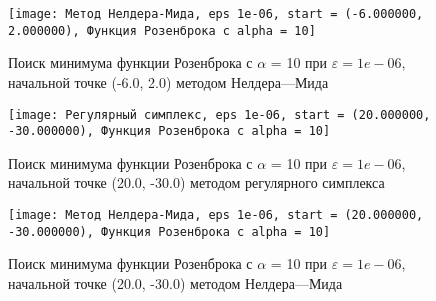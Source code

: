             \begin{figure}[H]
	        \centering
	        \texttt{[image: Метод Нелдера-Мида, eps 1e-06, start = (-6.000000, 2.000000), Функция Розенброка с alpha = 10]}%
	        \caption{Поиск минимума функции Розенброка с $\alpha$ = 10 при $\varepsilon = 1e-06$, начальной точке (-6.0, 2.0) методом Нелдера---Мида}
	        \vspace*{-1.2cm}
            \end{figure}
            
            \begin{figure}[H]
	        \centering
	        \texttt{[image: Регулярный симплекс, eps 1e-06, start = (20.000000, -30.000000), Функция Розенброка с alpha = 10]}%
	        \caption{Поиск минимума функции Розенброка с $\alpha$ = 10 при $\varepsilon = 1e-06$, начальной точке (20.0, -30.0) методом регулярного симплекса}
	        \vspace*{-1.2cm}
            \end{figure}
            
            \begin{figure}[H]
	        \centering
	        \texttt{[image: Метод Нелдера-Мида, eps 1e-06, start = (20.000000, -30.000000), Функция Розенброка с alpha = 10]}%
	        \caption{Поиск минимума функции Розенброка с $\alpha$ = 10 при $\varepsilon = 1e-06$, начальной точке (20.0, -30.0) методом Нелдера---Мида}
	        \vspace*{-1.2cm}
            \end{figure}
            